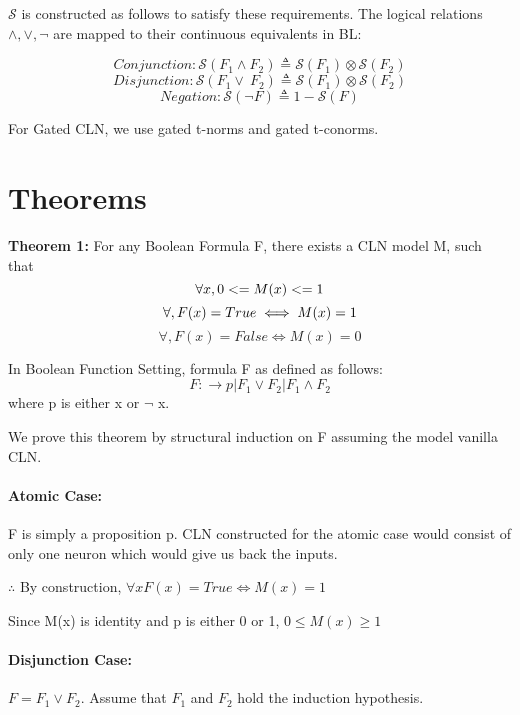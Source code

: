 $\mathcal{S}$ is constructed as follows to satisfy these requirements. The
logical relations {$\wedge, \lor, \lnot$} are mapped to their continuous
equivalents in BL:

$$Conjunction: \mathcal{S}(F_{1} \wedge F_{2}) \triangleq \mathcal{S} (F_{1}) \otimes \mathcal{S} (F_{2})$$
$$Disjunction: \mathcal{S}(F_{1} \lor \ F_{2}) \triangleq \mathcal{S} (F_{1}) \otimes \mathcal{S} (F_{2})$$
$$Negation: \mathcal{S}(\neg{F}) \triangleq 1 - \mathcal{S}(F)$$

For Gated CLN, we use gated t-norms and gated t-conorms.

\section{Theorems}
\noindent\textbf{Theorem 1: } For any Boolean Formula F, there exists a CLN model M, such that
\begin{equation}
    \forall x, 0 <= M(x) <= 1 \\
\end{equation}
\begin{equation}
    \forall, F(x) = True \iff M(x) = 1 \\
\end{equation}
\begin{equation}
    \forall, F(x) = False \iff M(x) = 0
\end{equation}

In Boolean Function Setting, formula F as defined as follows:
$$F:\rightarrow p | F_1 \lor F_2 | F_1 \wedge F_2$$
where p is either x or $\neg$ x.

We prove this theorem by structural induction on F assuming the model vanilla CLN.

\noindent\paragraph{Atomic Case: } F is simply a proposition p. CLN constructed 
for the atomic case would consist of only one neuron which would give us back the inputs.

$\therefore$ By construction, $\forall x F(x) = True \iff M(x) = 1$

Since M(x) is identity and p is either 0 or 1, $0 \leq M(x) \geq 1$

\noindent\paragraph{Disjunction Case: } $F = F_1 \lor F_2$. 
Assume that $F_1$ and $F_2$ hold the induction hypothesis.

